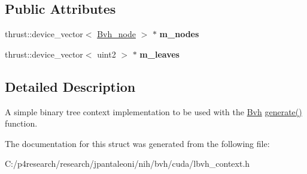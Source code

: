 \subsection*{\-Public \-Attributes}
\begin{DoxyCompactItemize}
\item 
\hypertarget{structnih_1_1cuda_1_1_l_b_v_h__context_a2d63b0fd570598396a3889df1cb222c9}{
thrust\-::device\-\_\-vector$<$ \hyperlink{structnih_1_1_bvh__node}{\-Bvh\-\_\-node} $>$ $\ast$ {\bfseries m\-\_\-nodes}}
\label{structnih_1_1cuda_1_1_l_b_v_h__context_a2d63b0fd570598396a3889df1cb222c9}

\item 
\hypertarget{structnih_1_1cuda_1_1_l_b_v_h__context_ac24338e22f4620f7fc7e3d5271652b9d}{
thrust\-::device\-\_\-vector$<$ uint2 $>$ $\ast$ {\bfseries m\-\_\-leaves}}
\label{structnih_1_1cuda_1_1_l_b_v_h__context_ac24338e22f4620f7fc7e3d5271652b9d}

\end{DoxyCompactItemize}


\subsection{\-Detailed \-Description}
\-A simple binary tree context implementation to be used with the \hyperlink{structnih_1_1_bvh}{\-Bvh} \hyperlink{group__bintree_gad76a50ae08ab4d525f748a7cbcc0fb6e}{generate()} function. 

\-The documentation for this struct was generated from the following file\-:\begin{DoxyCompactItemize}
\item 
\-C\-:/p4research/research/jpantaleoni/nih/bvh/cuda/lbvh\-\_\-context.\-h\end{DoxyCompactItemize}
